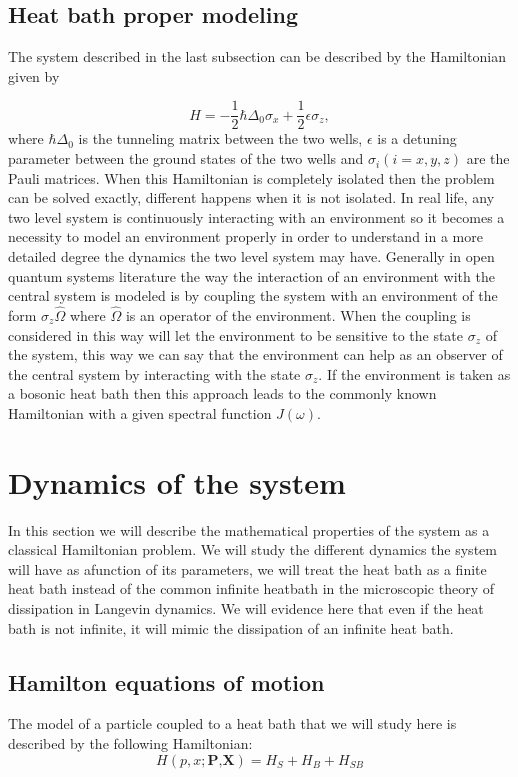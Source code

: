 \subsection{Heat bath proper modeling}

The system described in the last subsection can be described by the Hamiltonian given by

\begin{equation}
H=-\frac{1}{2}\hbar\Delta_0\sigma_x	+\frac{1}{2}\epsilon\sigma_z,
\end{equation}
where $\hbar\Delta_0$ is the tunneling matrix between the two wells, $\epsilon$ is a detuning parameter between the ground states of the two wells and $\sigma_i(i=x,y,z)$ are the Pauli matrices. When this Hamiltonian is completely isolated then the problem can be solved exactly, different happens when it is not isolated. In real life, any two level system is continuously interacting with an environment so it becomes a necessity to model an environment properly in order to understand in a more detailed degree the dynamics the two level system may have. Generally in open quantum systems literature \cite{leggett1987dynamics} the way the interaction of an environment with the central system is modeled is by coupling the system with an environment  of the form $\sigma_z\hat{\Omega}$ where $\hat{\Omega}$ is an operator of the environment. When the coupling is considered in this way will let the environment to be sensitive to the state $\sigma_z$ of the system, this way we can say that the environment can help as an observer of the central system by interacting with the state $\sigma_z$. If the environment is taken as a bosonic heat bath then this approach leads to the commonly known  Hamiltonian with a given spectral function $J(\omega)$.


\section{Dynamics of the system}
In this section we will describe the mathematical properties of the system as a classical Hamiltonian problem. We will study the different dynamics the system will have as afunction of its parameters, we will treat the heat bath as a finite heat bath instead of the common infinite heatbath in the microscopic theory of dissipation in Langevin dynamics. We will evidence here that even if the heat bath is not infinite, it will mimic the dissipation of an infinite heat bath.

\subsection{Hamilton equations of motion}
The model of a particle coupled to a heat bath that we will study here is described by the following Hamiltonian:
\begin{equation}
H(p,x;\textbf{P,X})=H_{S}+H_B+H_{SB}
\label{eq:total_hamiltonian}
\end{equation}


